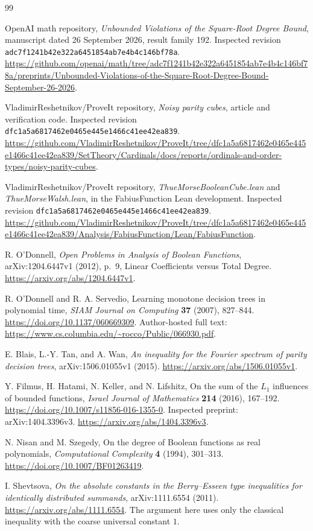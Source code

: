 \begin{thebibliography}{99}
\raggedright

OpenAI math repository,
\emph{Unbounded Violations of the Square-Root Degree Bound},
manuscript dated 26 September 2026, result family 192.
Inspected revision
\texttt{adc7f1241b42e322a6451854ab7e4b4c146bf78a}.
\url{https://github.com/openai/math/tree/adc7f1241b42e322a6451854ab7e4b4c146bf78a/preprints/Unbounded-Violations-of-the-Square-Root-Degree-Bound-September-26-2026}.

VladimirReshetnikov/ProveIt repository,
\emph{Noisy parity cubes}, article and verification code.
Inspected revision
\texttt{dfc1a5a6817462e0465e445e1466c41ee42ea839}.
\url{https://github.com/VladimirReshetnikov/ProveIt/tree/dfc1a5a6817462e0465e445e1466c41ee42ea839/SetTheory/Cardinals/docs/reports/ordinals-and-order-types/noisy-parity-cubes}.

VladimirReshetnikov/ProveIt repository,
\emph{ThueMorseBooleanCube.lean} and \emph{ThueMorseWalsh.lean},
in the FabiusFunction Lean development.
Inspected revision
\texttt{dfc1a5a6817462e0465e445e1466c41ee42ea839}.
\url{https://github.com/VladimirReshetnikov/ProveIt/tree/dfc1a5a6817462e0465e445e1466c41ee42ea839/Analysis/FabiusFunction/Lean/FabiusFunction}.

R. O'Donnell,
\emph{Open Problems in Analysis of Boolean Functions},
arXiv:1204.6447v1 (2012), p.~9, Linear Coefficients versus Total Degree.
\url{https://arxiv.org/abs/1204.6447v1}.

R. O'Donnell and R. A. Servedio,
Learning monotone decision trees in polynomial time,
\emph{SIAM Journal on Computing} \textbf{37} (2007), 827--844.
\url{https://doi.org/10.1137/060669309}.
Author-hosted full text:
\url{https://www.cs.columbia.edu/~rocco/Public/066930.pdf}.

E. Blais, L.-Y. Tan, and A. Wan,
\emph{An inequality for the Fourier spectrum of parity decision trees},
arXiv:1506.01055v1 (2015).
\url{https://arxiv.org/abs/1506.01055v1}.

Y. Filmus, H. Hatami, N. Keller, and N. Lifshitz,
On the sum of the \(L_1\) influences of bounded functions,
\emph{Israel Journal of Mathematics} \textbf{214} (2016), 167--192.
\url{https://doi.org/10.1007/s11856-016-1355-0}.
Inspected preprint: arXiv:1404.3396v3.
\url{https://arxiv.org/abs/1404.3396v3}.

N. Nisan and M. Szegedy,
On the degree of Boolean functions as real polynomials,
\emph{Computational Complexity} \textbf{4} (1994), 301--313.
\url{https://doi.org/10.1007/BF01263419}.

I. Shevtsova,
\emph{On the absolute constants in the Berry--Esseen type inequalities
for identically distributed summands},
arXiv:1111.6554 (2011).
\url{https://arxiv.org/abs/1111.6554}.
The argument here uses only the classical inequality with the
coarse universal constant \(1\).

\end{thebibliography}
